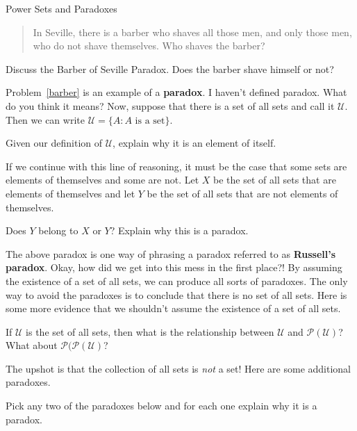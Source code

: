 \begin{section}{Power Sets and Paradoxes}
\begin{quote}
In Seville, there is a barber who shaves all those men, and only those men, who do not shave themselves.  Who shaves the barber?
\end{quote}

\begin{problem}\label{barber}
Discuss the Barber of Seville Paradox.  Does the barber shave himself or not?
\end{problem}

Problem~\ref{barber} is an example of a \textbf{paradox}.  I haven't defined paradox.  What do you think it means?  Now, suppose that there is a set of all sets and call it $\mathcal{U}$.  Then we can write $\mathcal{U}=\{A:A\mbox{ is a set}\}$.

\begin{problem}
Given our definition of $\mathcal{U}$, explain why it is an element of itself.
\end{problem}

If we continue with this line of reasoning, it must be the case that some sets are elements of themselves and some are not.  Let $X$ be the set of all sets that are elements of themselves and let $Y$ be the set of all sets that are not elements of themselves.

\begin{question}
Does $Y$ belong to $X$ or $Y$?  Explain why this is a paradox.
\end{question}

The above paradox is one way of phrasing a paradox referred to as \textbf{Russell's paradox}.  Okay, how did we get into this mess in the first place?!  By assuming the existence of a set of all sets, we can produce all sorts of paradoxes.  The only way to avoid the paradoxes is to conclude that there is no set of all sets.  Here is some more evidence that we shouldn't assume the existence of a set of all sets.

\begin{question}
If $\mathcal{U}$ is the set of all sets, then what is the relationship between $\mathcal{U}$ and $\mathcal{P}(\mathcal{U})$?  What about $\mathcal{P}(\mathcal{P}(\mathcal{U})$?
\end{question}

The upshot is that the collection of all sets is \emph{not} a set!  Here are some additional paradoxes.

\begin{problem}
Pick any two of the paradoxes below and for each one explain why it is a paradox.
\end{problem}


\end{section}
